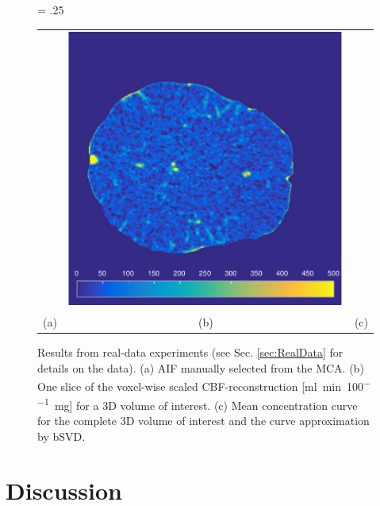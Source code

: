 \documentclass[journal,twocolumn]{IEEEtran}
\newlength{\fwd}
\begin{document}
	\begin{figure}[h!tb]\label{fig:RealData}
		\fwd = .25\textwidth
		\centering
		\begin{tabular}{ccc}
		 {\small} & \includegraphics[width = \fwd]{./figs/real_axial160.pdf} & {\small} \\
		 (a) & (b) & (c) 
		\end{tabular}
		\caption{Results from real-data experiments (see Sec. \ref{sec:RealData} for details on the data). (a) AIF manually selected from the MCA. (b) One slice of the voxel-wise scaled CBF-reconstruction [\si{\milli\litre\per\minute\per100\milli\gram}] for a 3D volume of interest. (c) Mean concentration curve for the complete 3D volume of interest and the curve approximation by bSVD.}
	\end{figure}
	

	
	
	\section{Discussion}\label{sec:conclusion}
	
\end{document}
